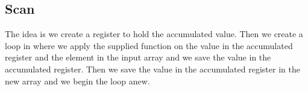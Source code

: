 \subsection{Scan}
The idea is we create a register to hold the accumulated value. Then we create a loop in where we apply the supplied function on the value in the accumulated register and the element in the input array and we save the value in the accumulated register. Then we save the value in the accumulated register in the new array and we begin the loop anew.